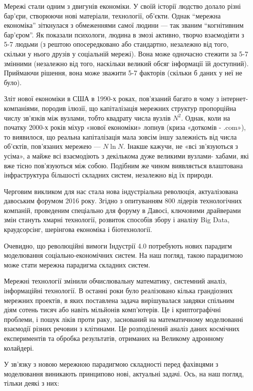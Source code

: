 \documentclass[
  letterpaper,
]{report}
\begin{document}
Мережі стали одним з двигунів економіки. У своїй історії людство долало
різні бар'єри, створюючи нові матеріали, технології, об'єкти. Однак
``мережна економіка'' зіткнулася з обмеженнями самої людини --- так
званим ``когнітивним бар'єром''. Як показали психологи, людина в змозі
активно, творчо взаємодіяти з 5-7 людьми (з рештою опосередковано або
стандартно, незалежно від того, скільки у нього друзів у соціальній
мережі). Вона може одночасно стежити за 5-7 змінними (незалежно від
того, наскільки великий обсяг інформації їй доступний). Приймаючи
рішення, вона може зважити 5-7 факторів (скільки б даних у неї не було).

Зліт нової економіки в США в 1990-х роках, пов'язаний багато в чому з
інтернет- компаніями, породив ілюзії, що капіталізація мережних структур
пропорційна числу зв'язків між вузлами, тобто квадрату числа вузлів
\(N^2\). Однак, коли на початку 2000-х років міхур «нової економіки»
лопнув (криза «доткомів - .com»), то виявилося, що реальна капіталізація
мала зовсім іншу залежність від числа об'єктів, пов'язаних мережею ---
\(N\ln{N}\). Інакше кажучи, не «всі зв'язуються з усіма», а майже всі
взаємодіють з декількома дуже великими вузлами- хабами, які вже тісно
пов'язуються між собою. Подібним же чином виявляється влаштована
інфраструктура більшості складних систем, незалежно від їх природи.

Черговим викликом для нас стала нова індустріальна революція,
актуалізована давоським форумом 2016 року. Згідно з опитуванням 800
лідерів технологічних компаній, проведеним спеціально для форуму в
Давосі, ключовими драйверами змін стануть хмарні технології, розвиток
способів збору і аналізу Big Data, краудсорсінг, шерінгова економіка і
біотехнології.

Очевидно, що революційні вимоги Індустрії 4.0 потребують нових парадигм
моделювання соціально-економічних систем. На наш погляд, такою
парадигмою може стати мережна парадигма складних систем.

Мережні технології змінили обчислювальну математику, системний аналіз,
інформаційні технології. В останні роки було реалізовано кілька
грандіозних мережних проектів, в яких поставлена задача вирішувалася
завдяки спільним діям сотень тисяч або навіть мільйонів комп'ютерів. Це
і криптографічні проблеми, і пошук ліків проти раку, заснований на
математичному моделюванні взаємодії різних речовин з клітинами. Це
розподілений аналіз даних космічних експериментів та обробка
результатів, отриманих на Великому адронному колайдері.

У зв'язку з новою мережною парадигмою складності перед фахівцями з
моделювання виникають принципово нові, актуальні задачі. Ось, на наш
погляд, тільки деякі з них:
\end{document}
